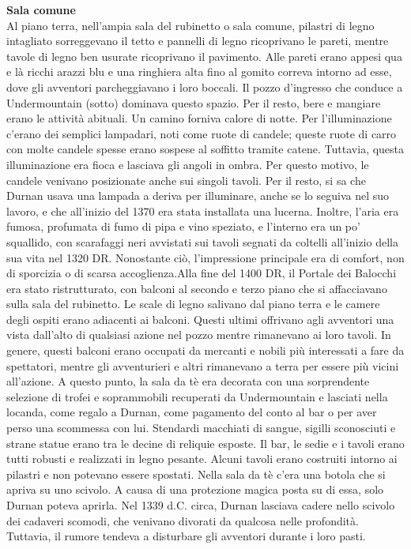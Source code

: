 \documentclass{article}
\begin{document}
\textbf{Sala comune} \\ Al piano terra, nell'ampia sala del rubinetto o sala comune, pilastri di legno intagliato sorreggevano il tetto e pannelli di legno ricoprivano le pareti, mentre tavole di legno ben usurate ricoprivano il pavimento. Alle pareti erano appesi qua e là ricchi arazzi blu e una ringhiera alta fino al gomito correva intorno ad esse, dove gli avventori parcheggiavano i loro boccali. Il pozzo d'ingresso che conduce a Undermountain (sotto) dominava questo spazio. Per il resto, bere e mangiare erano le attività abituali. Un camino forniva calore di notte.
Per l'illuminazione c'erano dei semplici lampadari, noti come ruote di candele; queste ruote di carro con molte candele spesse erano sospese al soffitto tramite catene. Tuttavia, questa illuminazione era fioca e lasciava gli angoli in ombra. Per questo motivo, le candele venivano posizionate anche sui singoli tavoli. Per il resto, si sa che Durnan usava una lampada a deriva per illuminare, anche se lo seguiva nel suo lavoro, e che all'inizio del 1370 era stata installata una lucerna. Inoltre, l'aria era fumosa, profumata di fumo di pipa e vino speziato, e l'interno era un po' squallido, con scarafaggi neri avvistati sui tavoli segnati da coltelli all'inizio della sua vita nel 1320 DR. Nonostante ciò, l'impressione principale era di comfort, non di sporcizia o di scarsa accoglienza.Alla fine del 1400 DR, il Portale dei Balocchi era stato ristrutturato, con balconi al secondo e terzo piano che si affacciavano sulla sala del rubinetto. Le scale di legno salivano dal piano terra e le camere degli ospiti erano adiacenti ai balconi. Questi ultimi offrivano agli avventori una vista dall'alto di qualsiasi azione nel pozzo mentre rimanevano ai loro tavoli. In genere, questi balconi erano occupati da mercanti e nobili più interessati a fare da spettatori, mentre gli avventurieri e altri rimanevano a terra per essere più vicini all'azione. A questo punto, la sala da tè era decorata con una sorprendente selezione di trofei e soprammobili recuperati da Undermountain e lasciati nella locanda, come regalo a Durnan, come pagamento del conto al bar o per aver perso una scommessa con lui. Stendardi macchiati di sangue, sigilli sconosciuti e strane statue erano tra le decine di reliquie esposte.
Il bar, le sedie e i tavoli erano tutti robusti e realizzati in legno pesante. Alcuni tavoli erano costruiti intorno ai pilastri e non potevano essere spostati.
Nella sala da tè c'era una botola che si apriva su uno scivolo. A causa di una protezione magica posta su di essa, solo Durnan poteva aprirla. Nel 1339 d.C. circa, Durnan lasciava cadere nello scivolo dei cadaveri scomodi, che venivano divorati da qualcosa nelle profondità. Tuttavia, il rumore tendeva a disturbare gli avventori durante i loro pasti.
\end{document}
